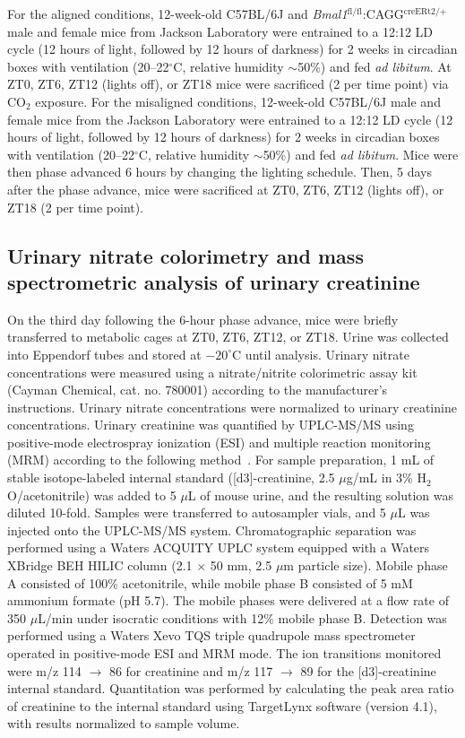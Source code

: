\documentclass[12pt]{article}
\begin{document}
For the aligned conditions, 12-week-old C57BL/6J and \textit{Bmal1}$^{\text{fl/fl}}$:CAGG$^{\text{creERt2/+}}$ male and female mice from Jackson Laboratory were entrained to a 12:12 LD cycle (12 hours of light, followed by 12 hours of darkness) for 2 weeks in circadian boxes with ventilation (20--22$^{\circ}$C, relative humidity $\sim$50\%) and fed \textit{ad libitum}. 
At ZT0, ZT6, ZT12 (lights off), or ZT18 mice were sacrificed (2 per time point) via CO$_2$ exposure. 
For the misaligned conditions, 12-week-old C57BL/6J male and female mice from the Jackson Laboratory were entrained to a 12:12 LD cycle (12 hours of light, followed by 12 hours of darkness) for 2 weeks in circadian boxes with ventilation (20--22$^{\circ}$C, relative humidity $\sim$50\%) and fed \textit{ad libitum}.
Mice were then phase advanced 6 hours by changing the lighting schedule. Then, 5 days after the phase advance, mice were sacrificed at ZT0, ZT6, ZT12 (lights off), or ZT18 (2 per time point).

\subsection*{Urinary nitrate colorimetry and mass spectrometric analysis of urinary creatinine}

On the third day following the 6-hour phase advance, mice were briefly transferred to metabolic cages at ZT0, ZT6, ZT12, or ZT18. Urine was collected into Eppendorf tubes and stored at $-20^{\circ}$C until analysis. Urinary nitrate concentrations were measured using a nitrate/nitrite colorimetric assay kit (Cayman Chemical, cat. no. 780001) according to the manufacturer's instructions. Urinary nitrate concentrations were normalized to urinary creatinine concentrations. Urinary creatinine was quantified by UPLC-MS/MS using positive-mode electrospray ionization (ESI) and multiple reaction monitoring (MRM) according to the following method~\cite{ref140}. 
For sample preparation, 1 mL of stable isotope-labeled internal standard ([d3]-creatinine, 2.5 $\mu$g/mL in 3\% H$_2$O/acetonitrile) was added to 5 $\mu$L of mouse urine, and the resulting solution was diluted 10-fold.
Samples were transferred to autosampler vials, and 5 $\mu$L was injected onto the UPLC-MS/MS system.
Chromatographic separation was performed using a Waters ACQUITY UPLC system equipped with a Waters XBridge BEH HILIC column (2.1 $\times$ 50 mm, 2.5 $\mu$m particle size).
Mobile phase A consisted of 100\% acetonitrile, while mobile phase B consisted of 5 mM ammonium formate (pH 5.7).
The mobile phases were delivered at a flow rate of 350 $\mu$L/min under isocratic conditions with 12\% mobile phase B.
Detection was performed using a Waters Xevo TQS triple quadrupole mass spectrometer operated in positive-mode ESI and MRM mode.
The ion transitions monitored were m/z 114 $\rightarrow$ 86 for creatinine and m/z 117 $\rightarrow$ 89 for the [d3]-creatinine internal standard.
Quantitation was performed by calculating the peak area ratio of creatinine to the internal standard using TargetLynx software (version 4.1), with results normalized to sample volume.
\end{document}
